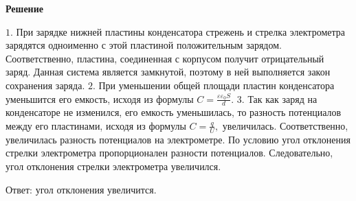 \documentclass[12pt,a4paper]{article}
\begin{document}
{\begin{center}\end{center}
}{
\smallskip\noindent\textbf{Решение}\par
$1$.  При зарядке нижней пластины конденсатора стрежень и стрелка электрометра зарядятся одноименно с этой пластиной положительным зарядом. Соответственно, пластина, соединенная с корпусом получит отрицательный заряд. Данная система является замкнутой, поэтому в ней выполняется закон сохранения заряда. 
$2$.  При уменьшении общей площади пластин конденсатора уменьшится его емкость, исходя из формулы $C= \frac{\varepsilon \varepsilon_0 S}{d} .$ 
$3$.  Так как заряд на конденсаторе не изменился, его емкость уменьшилась, то разность потенциалов между его пластинами, исходя из формулы $C= \frac{q}{U} ,$ увеличилась. Соответственно, увеличилась разность потенциалов на электрометре. По условию угол отклонения стрелки электрометра пропорционален разности потенциалов. Следовательно, угол отклонения стрелки электрометра увеличился. 

Ответ: угол отклонения увеличится.
}
\end{document}
